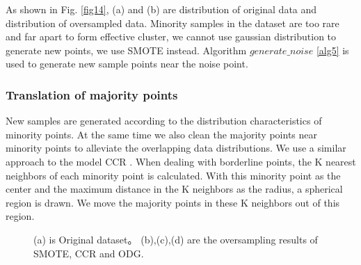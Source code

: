 \documentclass[runningheads]{llncs}
\begin{document}
As shown in Fig. \ref{fig14}, (a) and (b) are distribution of original data and 
distribution
 of oversampled data.
Minority samples in the dataset are too rare and far apart to form effective cluster, we cannot use
gaussian distribution to generate new points, we use SMOTE instead.
Algorithm $generate\_noise$ \ref{alg5} is used to generate new sample points near the noise point.
\subsubsection{Translation of majority points}
New samples are generated according to the 
distribution characteristics of minority points. 
At the same time we also clean the majority points
 near minority points to alleviate the overlapping data distributions.
We use a similar approach to the model CCR \cite{2017CCR}.
When dealing with borderline points, 
the K nearest neighbors of each minority point is calculated. 
With this minority point as the center and the maximum distance in the K neighbors as the radius, 
a spherical region is drawn. We move the majority points in these K neighbors out of this region.

\begin{figure}[tb]
  \centering
  \quad
  \quad
  \quad
  \caption{(a) is Original dataset。
  (b),(c),(d) are the oversampling results of SMOTE, CCR and ODG.}
  \label{fig18}
  \end{figure}
\end{document}
